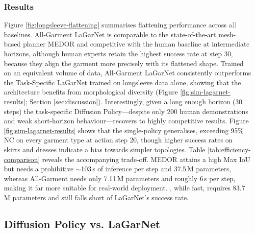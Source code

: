 \documentclass[journal]{IEEEtran}
\newif\ifshowrev\showrevtrue
\newcommand{\rev}[1]{\ifshowrev\textcolor{revblue}{#1}\else#1\fi}
\newif\ifshowirev\showirevtrue
\newcommand{\irev}[1]{\ifshowirev\textcolor{irevgreen}{#1}\else#1\fi}
\begin{document}
\subsubsection{Results} \label{sec:sota-result}

\rev{Figure \ref{fig:longsleeve-flattening} summarises flattening performance across all baselines. All-Garment LaGarNet is comparable to the state-of-the-art mesh-based planner MEDOR and competitive with the human baseline at intermediate horizons, although human experts retain the highest success rate at step 30, \irev{because they align the garment more precisely with its flattened shape}. Trained on an equivalent volume of data, All-Garment LaGarNet consistently outperforms the Task-Specific LaGarNet trained on longsleeve data alone, showing that the architecture benefits from morphological diversity \irev{(Figure \ref{fig:sim-lagarnet-results}; Section \ref{sec:discussion})}. Interestingly, given a long enough horizon (30 steps) the task-specific Diffusion Policy---despite only 200 human demonstrations and weak short-horizon behaviour---recovers to highly competitive results. Figure \ref{fig:sim-lagarnet-results} shows that the single-policy \text{LaGarNet} generalises, exceeding 95\% NC on every garment type at action step 20, though higher success rates on skirts and dresses indicate a bias towards simpler topologies.
Table \ref{tab:efficiency-comparison} reveals the accompanying trade-off. MEDOR attains a high Max IoU but needs a prohibitive $\sim$103\,s of inference per step and 37.5\,M parameters, whereas All-Garment \text{LaGarNet} needs only 7.11\,M parameters and roughly 6\,s per step, making it far more suitable for real-world deployment. \text{Diffusion Policy}, while fast, requires 83.7\,M parameters and still falls short of LaGarNet's success rate.}


\subsection{Diffusion Policy vs. LaGarNet} \label{sec:comp-diff}
\end{document}
